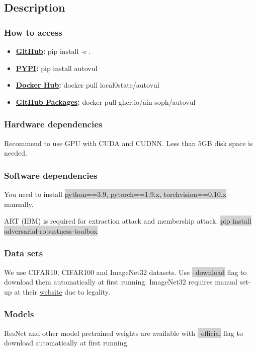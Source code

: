 \documentclass[letterpaper,twocolumn,10pt]{article}
\begin{document}
{%
\subsection{Description}

\subsubsection{How to access}

{\small
\begin{itemize}
    \item {\bf \href{https://github.com/ain-soph/autovul}{GitHub}: } pip install -e .
    \item {\bf \href{https://pypi.org/project/autovul/}{PYPI}: } pip install autovul
    \item {\bf \href{https://hub.docker.com/r/local0state/autovul}{Docker Hub}: } docker pull local0state/autovul
    \item {\bf \href{https://github.com/ain-soph/autovul/pkgs/container/autovul}{GitHub Packages}: } docker pull ghcr.io/ain-soph/autovul
\end{itemize}

\subsubsection{Hardware dependencies}
Recommend to use GPU with CUDA and CUDNN. Less than 5GB disk space is needed.
\subsubsection{Software dependencies}
You need to install \colorbox{lightgray}{python==3.9, pytorch==1.9.x, torchvision==0.10.x} manually.

ART (IBM) is required for extraction attack and membership attack. \colorbox{lightgray}{pip install adversarial-robustness-toolbox}

\subsubsection{Data sets}
We use CIFAR10, CIFAR100 and ImageNet32 datasets. Use \colorbox{lightgray}{--download} flag to download them automatically at first running. ImageNet32 requires manual set-up at their \href{https://image-net.org/download-images.php}{website} due to legality.
\subsubsection{Models}
ResNet and other model pretrained weights are available with \colorbox{lightgray}{--official} flag to download automatically at first running.

}}
\end{document}
